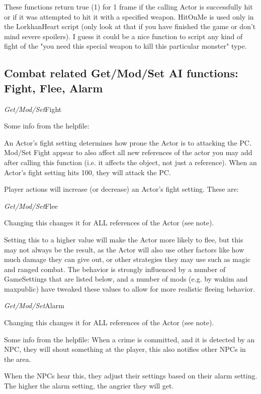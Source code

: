 \documentclass[
]{article}
\begin{document}
These functions return true (1) for 1 frame if the calling Actor is
successfully hit or if it was attempted to hit it with a specified
weapon. HitOnMe is used only in the LorkhanHeart script (only look at
that if you have finished the game or don't mind severe spoilers). I
guess it could be a nice function to script any kind of fight of the
"you need this special weapon to kill this particular monster" type.

\hypertarget{combat-related-getmodset-ai-functions-fight-flee-alarm}{%
\subsection{Combat related Get/Mod/Set AI functions: Fight, Flee,
Alarm}\label{combat-related-getmodset-ai-functions-fight-flee-alarm}}

\emph{Get/Mod/Set}Fight

Some info from the helpfile:

An Actor's fight setting determines how prone the Actor is to attacking
the PC. Mod/Set Fight appear to also affect all new references of the
actor you may add after calling this function (i.e. it affects the
object, not just a reference). When an Actor's fight setting hits 100,
they will attack the PC.

Player actions will increase (or decrease) an Actor's fight setting.
These are:

\emph{Get/Mod/Set}Flee

Changing this changes it for ALL references of the Actor (see note).

Setting this to a higher value will make the Actor more likely to flee,
but this may not always be the result, as the Actor will also use other
factors like how much damage they can give out, or other strategies they
may use such as magic and ranged combat. The behavior is strongly
influenced by a number of GameSettings that are listed below, and a
number of mods (e.g. by wakim and maxpublic) have tweaked these values
to allow for more realistic fleeing behavior.

\emph{Get/Mod/Set}Alarm

Changing this changes it for ALL references of the Actor (see note).

Some info from the helpfile: When a crime is committed, and it is
detected by an NPC, they will shout something at the player, this also
notifies other NPCs in the area.

When the NPCs hear this, they adjust their settings based on their alarm
setting. The higher the alarm setting, the angrier they will get.
\end{document}
